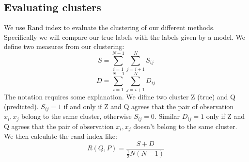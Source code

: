 \documentclass{article}
\begin{document}
\subsection*{Evaluating clusters}
We use Rand index to evaluate the clustering of our different methods. Specifically we will compare our true labels with the labels given by a model.
We define two measures from our clustering:
\begin{equation}
S=\sum_{i=1}^{N-1} \sum_{j=i+1}^{N} S_{i j}
\end{equation}
\begin{equation}
D=\sum_{i=1}^{N-1} \sum_{j=i+1}^{N} D_{i j}
\end{equation}
The notation requires some explanation. We difine two cluster Z (true) and Q (predicted). $S_{ij} = 1$ if and only if  Z and Q agrees that the pair of observation ${x_i,x_j}$ belong to the same cluster, otherwise $S_{ij} = 0$. Similar  $D_{ij} = 1$ only if Z and Q agrees that the pair of observation ${x_i,x_j}$ doesn't belong to the same cluster. 
We then calculate the rand index like:
\begin{equation}
R(Q, P)=\frac{S+D}{\frac{1}{2} N(N-1)}
\end{equation}
\end{document}
